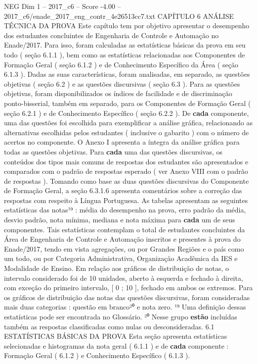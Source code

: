 \begin{textsample}{NEG Dim 1 – 2017\_c6 – Score -4.00 – 2017\_c6/enade\_2017\_eng\_contr\_4e26513cc7.txt}  \label{ex:f1_neg_149}
CAPÍTULO 6 ANÁLISE TÉCNICA DA PROVA Este capítulo tem por objetivo apresentar o desempenho dos estudantes concluintes de Engenharia de Controle e Automação no Enade/2017.
Para isso, foram calculadas as estatísticas básicas da prova em seu todo ( seção 6.1.1 ), bem como as estatísticas relacionadas aos Componentes de Formação Geral ( seção 6.1.2 ) e de Conhecimento Específico da Área ( seção 6.1.3 ).
Dadas as suas características, foram analisadas, em separado, as questões objetivas ( seção 6.2 ) e as questões discursivas ( seção 6.3 ).
Para as questões objetivas, foram disponibilizados os índices de facilidade e de discriminação ponto-bisserial, também em separado, para os Componentes de Formação Geral ( seção 6.2.1 ) e de Conhecimento Específico ( seção 6.2.2 ).
De \textbf{cada} componente, uma das questões foi escolhida para exemplificar a análise gráfica, relacionando as alternativas escolhidas pelos estudantes ( inclusive o gabarito ) com o número de acertos no componente.
O Anexo I apresenta a íntegra da análise gráfica para todas as questões objetivas.
Para \textbf{cada} uma das questões discursivas, os conteúdos dos tipos mais comuns de respostas dos estudantes são apresentados e comparados com o padrão de respostas esperado ( ver Anexo VIII com o padrão de respostas ).
Tomando como base as duas questões discursivas do Componente de Formação Geral, a seção 6.3.1.6 apresenta comentários sobre a correção das respostas com respeito à Língua Portuguesa.
As tabelas apresentam as seguintes estatísticas das notas¹⁹ : média do desempenho na prova, erro padrão da média, desvio padrão, nota mínima, mediana e nota máxima para \textbf{cada} um de seus componentes.
Tais estatísticas contemplam o total de estudantes concluintes da Área de Engenharia de Controle e Automação inscritos e presentes à prova do Enade/2017, tendo em vista agregações, ou por Grandes Regiões e o país como um todo, ou por Categoria Administrativa, Organização Acadêmica da IES e Modalidade de Ensino.
Em relação aos gráficos de distribuição de notas, o intervalo considerado foi de 10 unidades, aberto à esquerda e fechado à direita, com exceção do primeiro intervalo, [ 0 ; 10 ], fechado em ambos os extremos.
Para os gráficos de distribuição das notas das questões discursivas, foram consideradas mais duas categorias : questão em branco²⁰ e nota zero. ¹⁹ Uma definição dessas estatísticas pode ser encontrada no Glossário. ²⁰ Nesse grupo \textbf{estão} incluídas também as respostas classificadas como nulas ou desconsideradas. 6.1 ESTATÍSTICAS BÁSICAS DA PROVA Esta seção apresenta estatísticas selecionadas e histogramas da nota geral ( 6.1.1 ) e de \textbf{cada} componente : Formação Geral ( 6.1.2 ) e Conhecimento Específico ( 6.1.3 ).

\end{textsample}
